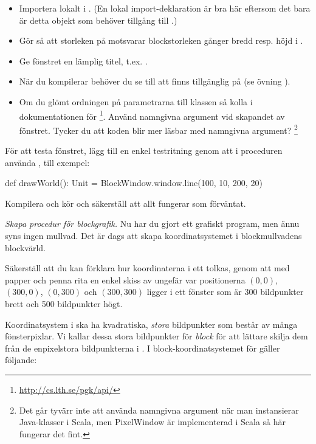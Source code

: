 \begin{itemize}%
  \item Importera  lokalt i . (En lokal import-deklaration är bra här eftersom det bara är detta objekt som behöver tillgång till .)
  \item Gör så att storleken på  motsvarar blockstorleken gånger bredd resp. höjd i .
  \item Ge fönstret en lämplig titel, t.ex. .
  \item När du kompilerar behöver du se till att  finns tillgänglig på  (se övning \texttt{\ExeWeekFOUR}).
  \item Om du glömt ordningen på parametrarna till klassen  så kolla i dokumentationen för  \footnote{\url{http://cs.lth.se/pgk/api/}}. Använd namngivna argument vid skapandet av fönstret. Tycker du att koden blir mer läsbar med namngivna argument? \footnote{Det går tyvärr inte att använda namngivna argument när man instansierar Java-klasser i Scala, men PixelWindow är implementerad i Scala så här fungerar det fint.}
\end{itemize}

För att testa fönstret, lägg till en enkel testritning genom att i proceduren  använda , till exempel:
\begin{Code}
  def drawWorld(): Unit = {
    BlockWindow.window.line(100, 10, 200, 20)
  }
\end{Code}
Kompilera och kör och säkerställ att allt fungerar som förväntat.


\Task \emph{Skapa procedur för blockgrafik.} Nu har du gjort ett grafiskt program, men ännu syns ingen mullvad.
Det är dags att skapa koordinatsystemet i blockmullvadens blockvärld.

\Subtask\Pen
Säkerställ att du kan förklara hur koordinaterna i ett  tolkas, genom att med papper och penna rita en enkel skiss av ungefär var positionerna $(0,0)$, $(300, 0)$, $(0, 300)$ och $(300, 300)$ ligger i ett fönster som är 300 bildpunkter brett och 500 bildpunkter högt.

\Subtask
Koordinatsystem i  ska ha kvadratiska, \emph{stora} bildpunkter som består av många fönsterpixlar. Vi kallar dessa stora bildpunkter för \emph{block} för att lättare skilja dem från de enpixelstora bildpunkterna i . I block-koordinatsystemet för  gäller följande:

